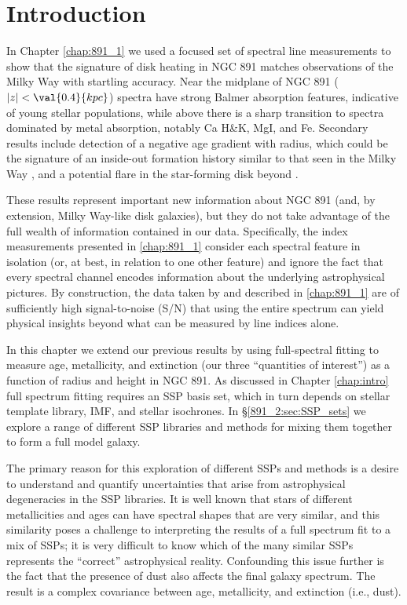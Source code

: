 \section{Introduction}

In Chapter \ref{chap:891_1} we used a focused set of spectral line
measurements to show that the signature of disk heating in NGC 891
matches observations of the Milky Way \citep[e.g.,][]{Bovy12,
  Hayden15} with startling accuracy. Near the midplane of NGC 891
($|z| < \val{0.4}{kpc}$) spectra have strong Balmer absorption
features, indicative of young stellar populations, while above
 there is a sharp transition to spectra dominated by
metal absorption, notably Ca H\&K, MgI, and Fe. Secondary results
include detection of a negative age gradient with radius, which could
be the signature of an inside-out formation history similar to that
seen in the Milky Way \citep{Bovy12, Hayden15}, and a potential flare
in the star-forming disk beyond .

These results represent important new information about NGC 891 (and,
by extension, Milky Way-like disk galaxies), but they do not take
advantage of the full wealth of information contained in our
data. Specifically, the index measurements presented in
\ref{chap:891_1} consider each spectral feature in isolation
(or, at best, in relation to one other feature) and ignore the fact
that every spectral channel encodes information about the underlying
astrophysical pictures. By construction, the data taken by \GP and
described in \ref{chap:891_1} are of sufficiently high
signal-to-noise (S/N) that using the entire spectrum can yield
physical insights beyond what can be measured by line indices alone.

In this chapter we extend our previous results by using full-spectral
fitting to measure age, metallicity, and extinction (our three
``quantities of interest'') as a function of radius and height in NGC
891. As discussed in Chapter \ref{chap:intro} full spectrum fitting
requires an SSP basis set, which in turn depends on stellar template
library, IMF, and stellar isochrones. In \S\ref{891_2:sec:SSP_sets} we
explore a range of different SSP libraries and methods for mixing them
together to form a full model galaxy.

The primary reason for this exploration of different SSPs and methods
is a desire to understand and quantify uncertainties that arise from
astrophysical degeneracies in the SSP libraries. It is well known
\citep{Oconnel76,Aaronson78,Worthey94,dePaz02} that stars of different
metallicities and ages can have spectral shapes that are very similar,
and this similarity poses a challenge to interpreting the results of a
full spectrum fit to a mix of SSPs; it is very difficult to know which
of the many similar SSPs represents the ``correct'' astrophysical
reality. Confounding this issue further is the fact that the presence
of dust also affects the final galaxy spectrum. The result is a
complex covariance between age, metallicity, and extinction (i.e.,
dust).

